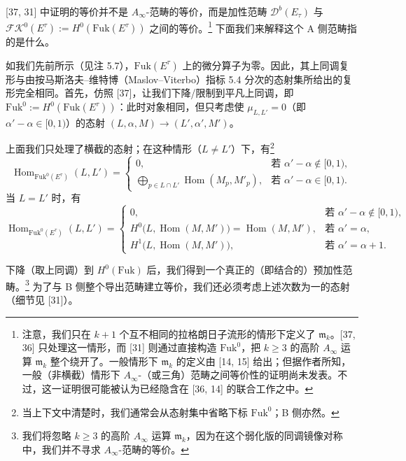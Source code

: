 \documentclass[11pt,a4paper]{article}
\theoremstyle{plain}
\theoremstyle{definition}
\begin{document}
[37, 31] 中证明的等价并不是 $A_\infty$-范畴的等价，而是加性范畴 $\mathcal{D}^b(E_\tau)$ 与 $\mathcal{FK}^0(E^\tau):=H^0(\mathrm{Fuk}(E^\tau))$ 之间的等价。\footnote{注意，我们只在 $k+1$ 个互不相同的拉格朗日子流形的情形下定义了 $\mathfrak{m}_k$。[37, 36] 只处理这一情形，而 [31] 则通过直接构造 $\mathrm{Fuk}^0$，把 $k\ge 3$ 的高阶 $A_\infty$ 运算 $\mathfrak{m}_k$ 整个绕开了。一般情形下 $\mathfrak{m}_k$ 的定义由 [14, 15] 给出；但据作者所知，一般（非横截）情形下 $A_\infty$-（或三角）范畴之间等价性的证明尚未发表。不过，这一证明很可能被认为已经隐含在 [36, 14] 的联合工作之中。} 下面我们来解释这个 A 侧范畴指的是什么。

如我们先前所示（见注 5.7），$\mathrm{Fuk}(E^\tau)$ 上的微分算子为零。因此，其上同调复形与由按马斯洛夫–维特博（Maslov–Viterbo）指标 5.4 分次的态射集所给出的复形完全相同。首先，仿照 [37]，让我们下降/限制到平凡上同调，即 $\mathrm{Fuk}^0:=H^0(\mathrm{Fuk}(E^\tau))$：此时对象相同，但只考虑使 $\mu_{L,L'}=0$（即 $\alpha'-\alpha\in[0,1)$）的态射 $(L,\alpha,M)\to(L',\alpha',M')$。

上面我们只处理了横截的态射；在这种情形（$L\neq L'$）下，有\footnote{当上下文中清楚时，我们通常会从态射集中省略下标 $\mathrm{Fuk}^0$；B 侧亦然。}
\[
\operatorname{Hom}_{\mathrm{Fuk}^{0}(E^{\tau})}(L,L')
=\begin{cases}
0, & \text{若 } \alpha'-\alpha\notin[0,1),\\[2pt]
\displaystyle\bigoplus_{p\in L\cap L'}\operatorname{Hom}(M_p,M'_p), & \text{若 } \alpha'-\alpha\in[0,1).
\end{cases}
\]
当 $L=L'$ 时，有
\[
\operatorname{Hom}_{\mathrm{Fuk}^{0}(E^{\tau})}(L,L')
=\begin{cases}
0, & \text{若 } \alpha'-\alpha\notin[0,1),\\[2pt]
H^{0}\bigl(L,\operatorname{Hom}(M,M')\bigr)=\operatorname{Hom}(M,M'), & \text{若 } \alpha'=\alpha,\\[2pt]
H^{1}\bigl(L,\operatorname{Hom}(M,M')\bigr), & \text{若 } \alpha'=\alpha+1.
\end{cases}
\]

下降（取上同调）到 $H^0(\mathrm{Fuk})$ 后，我们得到一个真正的（即结合的）预加性范畴。\footnote{我们将忽略 $k\ge 3$ 的高阶 $A_\infty$ 运算 $\mathfrak{m}_k$，因为在这个弱化版的同调镜像对称中，我们并不寻求 $A_\infty$-范畴的等价。} 为了与 B 侧整个导出范畴建立等价，我们还必须考虑上述次数为一的态射（细节见 [31]）。
\end{document}

